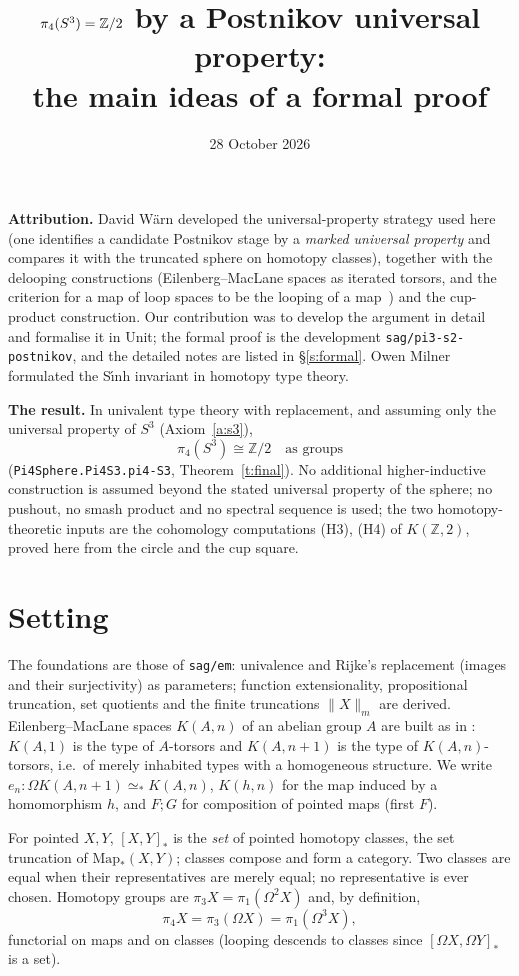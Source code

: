 \documentclass[11pt]{amsart}
\title{$\pi_4(S^3)=\Z/2$ by a Postnikov universal property:\\ the main ideas of a formal proof}
\date{28 October 2026}
\theoremstyle{definition}
\theoremstyle{remark}
\newcommand{\Om}{\Omega}
\newcommand{\Map}{\mathrm{Map}_*}
\newcommand{\Z}{\mathbb{Z}}
\newcommand{\code}[1]{\texttt{#1}}
\newcommand{\hc}[2]{[#1,#2]_*}
\newcommand{\tr}[1]{\|#1\|}
\begin{document}
\maketitle

\noindent\textbf{Attribution.} David W\"arn developed the
universal-property strategy used here (one identifies a candidate Postnikov stage by a
\emph{marked universal property} and compares it with the truncated sphere on homotopy
classes), together with the delooping constructions (Eilenberg--MacLane spaces as
iterated torsors, and the criterion for a map of loop spaces to be the looping of a
map~\cite{DW1}) and the cup-product construction. Our contribution was to develop the
argument in detail and formalise it in Unit; the formal proof is the development
\code{sag/pi3-s2-postnikov}, and the detailed notes are listed in \S\ref{s:formal}.
Owen Milner formulated the S\'{\i}nh invariant in homotopy type theory.

\smallskip\noindent\textbf{The result.} In univalent type theory with replacement,
and assuming only the universal property of $S^3$ (Axiom~\ref{a:s3}),
\[\pi_4(S^3)\cong\Z/2\quad\text{as groups}\]
(\code{Pi4Sphere.Pi4S3.pi4-S3}, Theorem~\ref{t:final}). No additional higher-inductive
construction is assumed beyond the stated universal property of the sphere; no pushout,
no smash product and no spectral sequence is used; the two homotopy-theoretic
inputs are the cohomology computations (H3), (H4) of $K(\Z,2)$, proved here from the
circle and the cup square.

\section{Setting}

The foundations are those of \code{sag/em}: univalence and Rijke's replacement
(images and their surjectivity) as parameters; function extensionality,
propositional truncation, set quotients and the finite truncations $\tr X_m$ are
derived. Eilenberg--MacLane spaces $K(A,n)$ of an abelian group $A$ are built as in
\cite{DW1}: $K(A,1)$ is the type of $A$-torsors and $K(A,n{+}1)$ is the type of
$K(A,n)$-torsors, i.e.\ of merely inhabited types with a homogeneous structure. We
write $e_n:\Om K(A,n{+}1)\simeq_*K(A,n)$, $K(h,n)$ for the map induced by a
homomorphism $h$, and $F;G$ for composition of pointed maps (first $F$).

For pointed $X,Y$, $\hc XY$ is the \emph{set} of pointed homotopy classes, the set
truncation of $\Map(X,Y)$; classes compose and form a category. Two classes are equal
when their representatives are merely equal; no representative is ever chosen.
Homotopy groups are $\pi_3X=\pi_1(\Om^2X)$ and, by definition,
\[\pi_4X=\pi_3(\Om X)=\pi_1(\Om^3X),\]
functorial on maps and on classes (looping descends to classes since $\hc{\Om X}{\Om Y}$
is a set).
\end{document}

